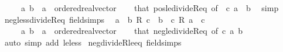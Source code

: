 \begin{isabellebody}
\ \ \ \ \ a\ b\ {\isacharcolon}{\kern0pt}{\isacharcolon}{\kern0pt}\ {\isachardoublequoteopen}{\isacharprime}{\kern0pt}a\ {\isacharcolon}{\kern0pt}{\isacharcolon}{\kern0pt}\ ordered{\isacharunderscore}{\kern0pt}real{\isacharunderscore}{\kern0pt}vector{\isachardoublequoteclose}\isanewline
%
\isadelimproof
\ \ %
\endisadelimproof
%
\isatagproof
{}\isamarkupfalse%
\ that\ pos{\isacharunderscore}{\kern0pt}le{\isacharunderscore}{\kern0pt}divideR{\isacharunderscore}{\kern0pt}eq\ {\isacharbrackleft}{\kern0pt}of\ {\isachardoublequoteopen}{\isacharminus}{\kern0pt}\ c{\isachardoublequoteclose}\ a\ {\isachardoublequoteopen}{\isacharminus}{\kern0pt}\ b{\isachardoublequoteclose}{\isacharbrackright}{\kern0pt}\ \isamarkupfalse%
\ simp%
\endisatagproof
{\isafoldproof}%
%
\isadelimproof
\isanewline
%
\endisadelimproof
\isanewline
{}\isamarkupfalse%
\ neg{\isacharunderscore}{\kern0pt}less{\isacharunderscore}{\kern0pt}divideR{\isacharunderscore}{\kern0pt}eq\ {\isacharbrackleft}{\kern0pt}field{\isacharunderscore}{\kern0pt}simps{\isacharbrackright}{\kern0pt}{\isacharcolon}{\kern0pt}\isanewline
\ \ {\isachardoublequoteopen}a\ {\isacharless}{\kern0pt}\ b\ {\isacharslash}{\kern0pt}\isactrlsub R\ c\ {\isasymlongleftrightarrow}\ b\ {\isacharless}{\kern0pt}\ c\ {\isacharasterisk}{\kern0pt}\isactrlsub R\ a{\isachardoublequoteclose}\ \ {\isachardoublequoteopen}c\ {\isacharless}{\kern0pt}\ {}{\isachardoublequoteclose}\isanewline
\ \ \ \ \ a\ b\ {\isacharcolon}{\kern0pt}{\isacharcolon}{\kern0pt}\ {\isachardoublequoteopen}{\isacharprime}{\kern0pt}a\ {\isacharcolon}{\kern0pt}{\isacharcolon}{\kern0pt}\ ordered{\isacharunderscore}{\kern0pt}real{\isacharunderscore}{\kern0pt}vector{\isachardoublequoteclose}\isanewline
%
\isadelimproof
\ \ %
\endisadelimproof
%
\isatagproof
{}\isamarkupfalse%
\ that\ neg{\isacharunderscore}{\kern0pt}le{\isacharunderscore}{\kern0pt}divideR{\isacharunderscore}{\kern0pt}eq\ {\isacharbrackleft}{\kern0pt}of\ c\ a\ b{\isacharbrackright}{\kern0pt}\ \isamarkupfalse%
\ {\isacharparenleft}{\kern0pt}auto\ simp\ add{\isacharcolon}{\kern0pt}\ le{\isacharunderscore}{\kern0pt}less{\isacharparenright}{\kern0pt}%
\endisatagproof
{\isafoldproof}%
%
\isadelimproof
\isanewline
%
\endisadelimproof
\isanewline
{}\isamarkupfalse%
\ neg{\isacharunderscore}{\kern0pt}divideR{\isacharunderscore}{\kern0pt}le{\isacharunderscore}{\kern0pt}eq\ {\isacharbrackleft}{\kern0pt}field{\isacharunderscore}{\kern0pt}simps{\isacharbrackright}{\kern0pt}{\isacharcolon}{\kern0pt}\isanewline

\end{isabellebody}
